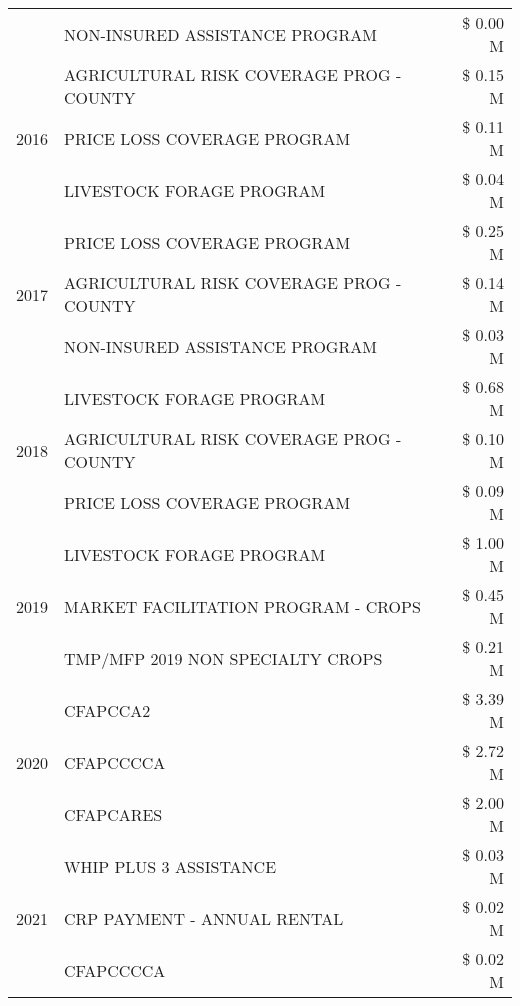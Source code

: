 \begin{tabular}{llr}
 & NON-INSURED ASSISTANCE PROGRAM & \$ 0.00 M \\
\cline{1-3}
\multirow[t]{3}{*}{2016} & AGRICULTURAL RISK COVERAGE PROG - COUNTY & \$ 0.15 M \\
 & PRICE LOSS COVERAGE PROGRAM & \$ 0.11 M \\
 & LIVESTOCK FORAGE PROGRAM & \$ 0.04 M \\
\cline{1-3}
\multirow[t]{3}{*}{2017} & PRICE LOSS COVERAGE PROGRAM & \$ 0.25 M \\
 & AGRICULTURAL RISK COVERAGE PROG - COUNTY & \$ 0.14 M \\
 & NON-INSURED ASSISTANCE PROGRAM & \$ 0.03 M \\
\cline{1-3}
\multirow[t]{3}{*}{2018} & LIVESTOCK FORAGE PROGRAM & \$ 0.68 M \\
 & AGRICULTURAL RISK COVERAGE PROG - COUNTY & \$ 0.10 M \\
 & PRICE LOSS COVERAGE PROGRAM & \$ 0.09 M \\
\cline{1-3}
\multirow[t]{3}{*}{2019} & LIVESTOCK FORAGE PROGRAM & \$ 1.00 M \\
 & MARKET FACILITATION PROGRAM - CROPS & \$ 0.45 M \\
 & TMP/MFP 2019 NON SPECIALTY CROPS & \$ 0.21 M \\
\cline{1-3}
\multirow[t]{3}{*}{2020} & CFAPCCA2 & \$ 3.39 M \\
 & CFAPCCCCA & \$ 2.72 M \\
 & CFAPCARES & \$ 2.00 M \\
\cline{1-3}
\multirow[t]{3}{*}{2021} & WHIP PLUS 3 ASSISTANCE & \$ 0.03 M \\
 & CRP PAYMENT - ANNUAL RENTAL & \$ 0.02 M \\
 & CFAPCCCCA & \$ 0.02 M \\
\cline{1-3}
\bottomrule
\end{tabular}
